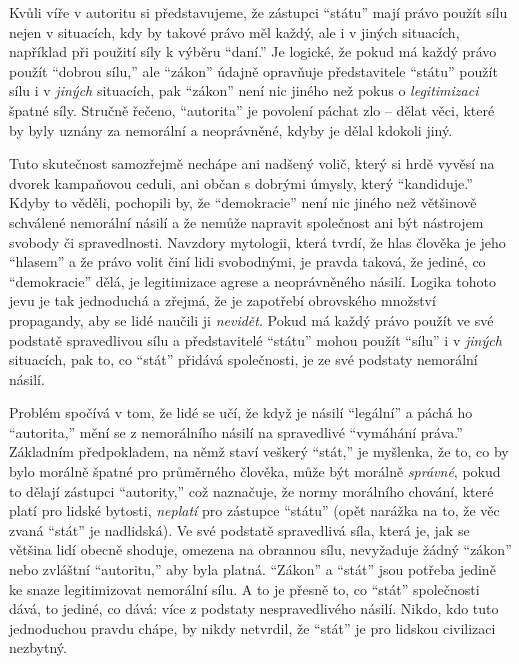 \documentclass{book}
\begin{document}
Kvůli víře v autoritu si představujeme, že zástupci \enquote{státu} mají právo použít sílu nejen v situacích, kdy by takové právo měl každý, ale i v jiných situacích, například při použití síly k výběru \enquote{daní.} Je logické, že pokud má každý právo použít \enquote{dobrou sílu,} ale \enquote{zákon} údajně opravňuje představitele \enquote{státu} použít sílu i v \emph{jiných} situacích, pak \enquote{zákon} není nic jiného než pokus o \emph{legitimizaci} špatné síly. Stručně řečeno, \enquote{autorita} je povolení páchat zlo -- dělat věci, které by byly uznány za nemorální a neoprávněné, kdyby je dělal kdokoli jiný.

Tuto skutečnost samozřejmě nechápe ani nadšený volič, který si hrdě vyvěsí na dvorek kampaňovou ceduli, ani občan s dobrými úmysly, který \enquote{kandiduje.} Kdyby to věděli, pochopili by, že \enquote{demokracie} není nic jiného než většinově schválené nemorální násilí a že nemůže napravit společnost ani být nástrojem svobody či spravedlnosti. Navzdory mytologii, která tvrdí, že hlas člověka je jeho \enquote{hlasem} a že právo volit činí lidi svobodnými, je pravda taková, že jediné, co \enquote{demokracie} dělá, je legitimizace agrese a neoprávněného násilí. Logika tohoto jevu je tak jednoduchá a zřejmá, že je zapotřebí obrovského množství propagandy, aby se lidé naučili ji \emph{nevidět}. Pokud má každý právo použít ve své podstatě spravedlivou sílu a představitelé \enquote{státu} mohou použít \enquote{sílu} i v \emph{jiných} situacích, pak to, co \enquote{stát} přidává společnosti, je ze své podstaty nemorální násilí.

Problém spočívá v tom, že lidé se učí, že když je násilí \enquote{legální} a páchá ho \enquote{autorita,} mění se z nemorálního násilí na spravedlivé \enquote{vymáhání práva.} Základním předpokladem, na němž staví veškerý \enquote{stát,} je myšlenka, že to, co by bylo morálně špatné pro průměrného člověka, může být morálně \emph{správné}, pokud to dělají zástupci \enquote{autority,} což naznačuje, že normy morálního chování, které platí pro lidské bytosti, \emph{neplatí} pro zástupce \enquote{státu} (opět narážka na to, že věc zvaná \enquote{stát} je nadlidská). Ve své podstatě spravedlivá síla, která je, jak se většina lidí obecně shoduje, omezena na obrannou sílu, nevyžaduje žádný \enquote{zákon} nebo zvláštní \enquote{autoritu,} aby byla platná. \enquote{Zákon} a \enquote{stát} jsou potřeba jedině ke snaze legitimizovat nemorální sílu. A to je přesně to, co \enquote{stát} společnosti dává, to jediné, co dává: více z podstaty nespravedlivého násilí. Nikdo, kdo tuto jednoduchou pravdu chápe, by nikdy netvrdil, že \enquote{stát} je pro lidskou civilizaci nezbytný.
\end{document}
